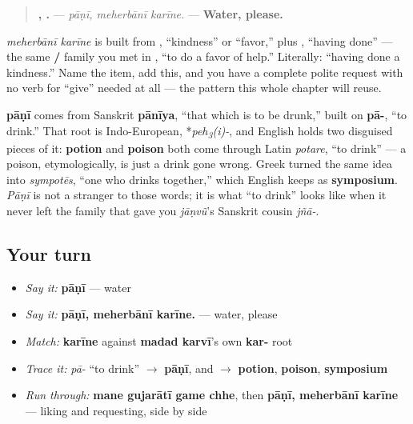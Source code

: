 \begin{grammarlens}[title={Grammar Lens: asking politely}]
\begin{quote}
\textbf{,  .} — \emph{pāṇī, meherbānī karīne.} — \textbf{Water, please.}
\end{quote}

\textbf{ } \emph{meherbānī karīne} is built from \textbf{}, \textquotedblleft{}kindness\textquotedblright{} or \textquotedblleft{}favor,\textquotedblright{} plus \textbf{}, \textquotedblleft{}having done\textquotedblright{} — the same \textbf{/} family you met in \textbf{ }, \textquotedblleft{}to do a favor of help.\textquotedblright{} Literally: \textquotedblleft{}having done a kindness.\textquotedblright{} Name the item, add this, and you have a complete polite request with no verb for \textquotedblleft{}give\textquotedblright{} needed at all — the pattern this whole chapter will reuse.
\end{grammarlens}

\begin{cousinweb}
\textbf{pāṇī} comes from Sanskrit \textbf{pānīya}, \textquotedblleft{}that which is to be drunk,\textquotedblright{} built on \textbf{pā-}, \textquotedblleft{}to drink.\textquotedblright{} That root is Indo-European, *\emph{peh\textsubscript{3}(i)-}, and English holds two disguised pieces of it: \textbf{potion} and \textbf{poison} both come through Latin \emph{potare}, \textquotedblleft{}to drink\textquotedblright{} — a poison, etymologically, is just a drink gone wrong. Greek turned the same idea into \emph{sympotēs}, \textquotedblleft{}one who drinks together,\textquotedblright{} which English keeps as \textbf{symposium}. \emph{Pāṇī} is not a stranger to those words; it is what \textquotedblleft{}to drink\textquotedblright{} looks like when it never left the family that gave you \emph{jāṇvũ}'s Sanskrit cousin \emph{jñā-}.
\end{cousinweb}

\subsection*{Your turn}
\begin{itemize}
\raggedright
  \item \emph{Say it:} \textbf{pāṇī} — water
  \item \emph{Say it:} \textbf{pāṇī, meherbānī karīne.} — water, please
  \item \emph{Match:} \textbf{karīne} against \textbf{madad karvī}'s own \textbf{kar-} root
  \item \emph{Trace it:} \emph{pā-} \textquotedblleft{}to drink\textquotedblright{} $\to$ \textbf{pāṇī}, and $\to$ \textbf{potion}, \textbf{poison}, \textbf{symposium}
  \item \emph{Run through:} \textbf{mane gujarātī game chhe}, then \textbf{pāṇī, meherbānī karīne} — liking and requesting, side by side
\end{itemize}


